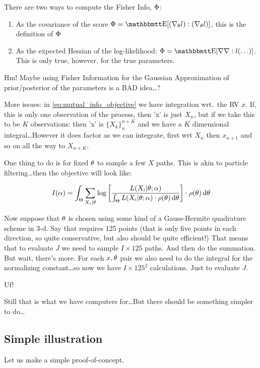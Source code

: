 \documentclass{article}
\begin{document}
There are two ways to compute the Fisher Info, ${\Phi}$:
\begin{enumerate}
  \item As the covariance of the score $\FI = \Exp[ (\grad_\th l) :  (\grad_\th
  l)]$, this is the definition of ${\Phi}$
  \item As the expected Hessian of the log-likelihood: $\FI = \Exp [ \grad
  \grad : l(\ldots)]$. This is only true, however, for the true parameters. 
\end{enumerate}

Hm! Maybe using Fisher Information for the Gaussian Approximation of
prior/posterior of the parameters is a BAD idea\ldots? 

More issues: in \cref{eq:mutual_info_objective} we have integration wrt.\ the RV
$x$. If, this is only one observation of the process, then 'x' is just $X_n$,
but if we take this to be $K$ observations: then 'x' is $\{X_k\}_n^{n+K}$ and we
have a $K$ dimensional integral\ldots However it does factor as we can
integrate, first wrt $X_n$ then $x_{n+1}$ and so on all the way to $X_{n+K}$.
% 

One thing to do is for fixed ${\theta}$ to sample a few $X$ paths. This is akin to
particle filtering\ldots then the objective will look like:

\begin{equation}
I({\alpha}) = \int_\Theta \sum_{X_i|{\theta}}  \log\left[\frac{L(X_i|{\theta}; {\alpha})}
										{\int_\Theta L(X_i|{\theta};{\alpha})\cdot \rho({\theta})\, \mathrm{d} {\theta}} \right]
										 \cdot \rho({\theta}) \, \mathrm{d} {\theta}
\label{eq:mutual_info_objective_particlized}
\end{equation}

Now suppose that ${\theta}$ is chosen using some kind of a Gauss-Hermite quadrature
scheme in 3-d. Say that requires 125 points (that is only five points in each
direction, so quite conservative, but also should be quite efficient!) That
means that to evaluate $J$ we need to sample $I \times 125$ paths. And then do
the summation. But wait, there's more. For each $x,{\theta}$ pair we also need to do
the integral for the normalizing constant\ldots so now we have $I \times 125^2$
calculations. Just to evaluate $J$.

Uf! 

Still that is what we have computers for\ldots But there should be something
simpler to do\ldots 

\subsection{Simple illustration}
Let us make a simple proof-of-concept.
\end{document}
